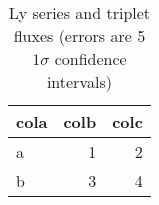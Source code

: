 \begin{table}
\caption{ Ly series and  triplet fluxes (errors are 5$1\sigma$ confidence intervals) \label{tab:nely}}
\begin{tabular}{lrr}\hline
cola & colb & colc\\
\hline
a & 1 & 2\\
b & 3 & 4\\
\hline
\end{tabular}
\end{table}